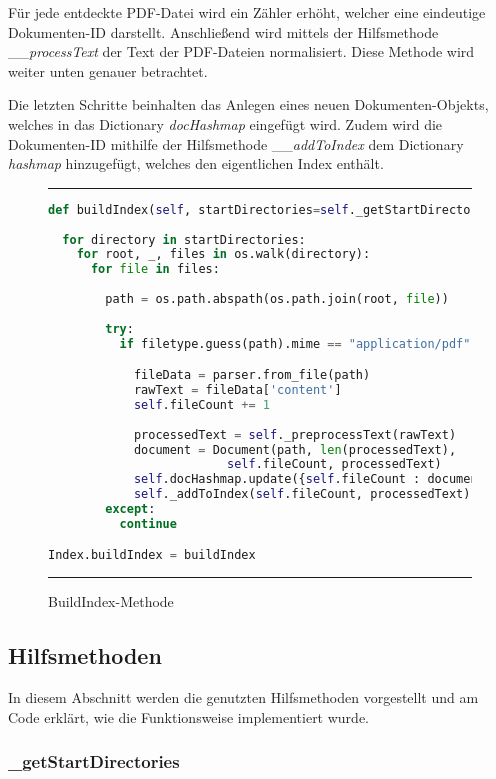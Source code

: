 Für jede entdeckte PDF-Datei wird ein Zähler erhöht, welcher eine eindeutige Dokumenten-ID darstellt. Anschließend wird mittels der Hilfsmethode \_\_\emph{processText} der Text der PDF-Dateien normalisiert. Diese Methode wird weiter unten genauer betrachtet. 

Die letzten Schritte beinhalten das Anlegen eines neuen Dokumenten-Objekts, welches in das Dictionary \emph{docHashmap} eingefügt wird. Zudem wird die Dokumenten-ID mithilfe der Hilfsmethode \_\_\emph{addToIndex} dem Dictionary \emph{hashmap} hinzugefügt, welches den eigentlichen Index enthält.

\begin{figure}[h]
	\rule{\textwidth}{0.4pt}
		\begin{lstlisting}[language=Python]
def buildIndex(self, startDirectories=self._getStartDirectories()):
    
  for directory in startDirectories:
    for root, _, files in os.walk(directory):
      for file in files:
                
        path = os.path.abspath(os.path.join(root, file))
                
        try:
          if filetype.guess(path).mime == "application/pdf":

            fileData = parser.from_file(path)
            rawText = fileData['content']
            self.fileCount += 1
                    
            processedText = self._preprocessText(rawText)
            document = Document(path, len(processedText),
                         self.fileCount, processedText)
            self.docHashmap.update({self.fileCount : document})
            self._addToIndex(self.fileCount, processedText)
        except:
          continue

Index.buildIndex = buildIndex
		\end{lstlisting}
	\rule{\textwidth}{0.4pt}
	\caption{BuildIndex-Methode}
	\label{fig:build}
\end{figure}

\subsection{Hilfsmethoden}\label{hilfsmethoden}

In diesem Abschnitt werden die genutzten Hilfsmethoden vorgestellt und am Code erklärt, wie die Funktionsweise implementiert wurde.

\subsubsection{\_getStartDirectories}

